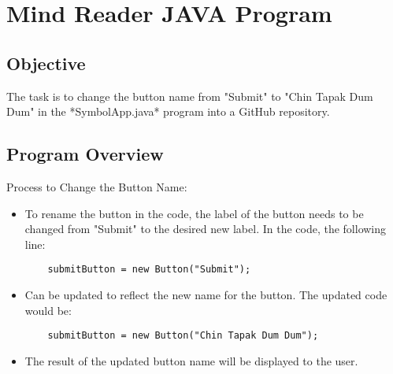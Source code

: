 \section{Mind Reader JAVA Program}
\subsection{Objective}
The task is to change the button name from "Submit" to "Chin Tapak Dum Dum" in the *SymbolApp.java* program into a GitHub repository.

\subsection{Program Overview}
Process to Change the Button Name:
\begin{itemize}
    \item To rename the button in the code, the label of the button needs to be changed from "Submit" to the desired new label. In the code, the following line:
    \begin{verbatim}
    submitButton = new Button("Submit");
    \end{verbatim}
    \item Can be updated to reflect the new name for the button. The updated code would be:
    \begin{verbatim}
    submitButton = new Button("Chin Tapak Dum Dum");
    \end{verbatim}
    \item The result of the updated button name will be displayed to the user.
\end{itemize}


